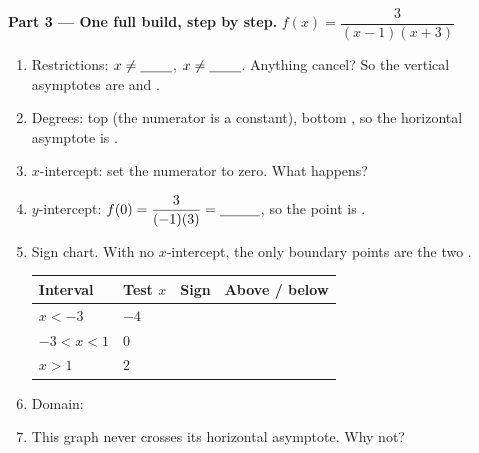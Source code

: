 \documentclass[10pt]{article}
\begin{document}
\begin{tcolorbox}[colback=white, colframe=black!40, title=\textbf{Tier R --- Remediate},
    fonttitle=\bfseries, arc=1.5mm, left=3mm, right=3mm, top=2mm, bottom=2mm, breakable]
\vspace{4pt}
\textbf{Part 3 --- One full build, step by step.} \; $f(x)=\dfrac{3}{(x-1)(x+3)}$
\begin{enumerate}[label=\arabic*., leftmargin=2.1em, itemsep=5pt]
  \item Restrictions: $x\neq\blank{0.8cm}$, $x\neq\blank{0.8cm}$. Anything cancel? \blank{0.9cm}
        \; So the vertical asymptotes are \blank{1.4cm} and \blank{1.4cm}.
  \item Degrees: top \blank{0.7cm} (the numerator is a constant), bottom \blank{0.7cm}, so the
        horizontal asymptote is \blank{1.4cm}.
  \item $x$-intercept: set the numerator to zero. What happens? \blank{4.6cm}
  \item $y$-intercept: $f(0)=\dfrac{3}{(-1)(3)}=\blank{1.0cm}$, so the point is \blank{1.4cm}.
  \item Sign chart. With no $x$-intercept, the only boundary points are the two \blank{2.6cm}.
        \begin{center}
        \renewcommand{\arraystretch}{1.5}
        \begin{tabularx}{0.9\linewidth}{|C{2.6cm}|C{1.6cm}|C{2.0cm}|X|}
        \hline
        \textbf{Interval} & \textbf{Test $x$} & \textbf{Sign} & \textbf{Above / below} \\ \hline
        $x<-3$   & $-4$ & & \\ \hline
        $-3<x<1$ & $0$  & & \\ \hline
        $x>1$    & $2$  & & \\ \hline
        \end{tabularx}
        \end{center}
  \item Domain: \blank{5.0cm}
  \item This graph never crosses its horizontal asymptote. Why not? \writeline
\end{enumerate}
\end{tcolorbox}
\end{document}
